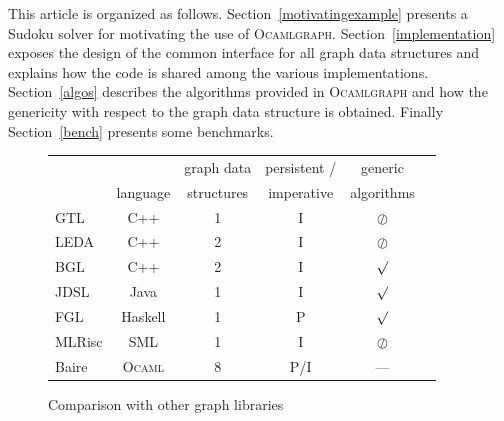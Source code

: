 \documentclass[tfpsymp]{tfp05symp}
\newcommand{\ocamlgraph}{\textsc{Ocamlgraph}\xspace}
\newcommand{\ocaml}{\textsc{Ocaml}\xspace}
\begin{document}
This article is organized as follows. Section~\ref{motivatingexample}
presents a Sudoku solver for motivating the use of \ocamlgraph.
Section~\ref{implementation} exposes the design of the common
interface for all graph data structures and explains how the code is
shared among the various implementations.  Section~\ref{algos}
describes the algorithms provided in \ocamlgraph and how the
genericity with respect to the graph data structure is obtained.
Finally Section~\ref{bench} presents some benchmarks.



\begin{figure}[t]
\newcommand{\present}{\large\boldmath $\surd$}
\newcommand{\absent}{\large\boldmath $\oslash$}

  \centering
  \begin{tabular}{|l||c|c|c|c|c|}
    \hline
     &          & graph data & persistent / & generic    \\
     & language & structures & imperative   & algorithms \\\hline\hline
     GTL \cite{Gtl} & C++     & 1  & I & \absent   \\\hline
     LEDA \cite{Leda} & C++    & 2  & I & \absent   \\\hline
     BGL \cite{Bgl} & C++     & 2  & I & \present  \\\hline
     JDSL \cite{Jdsl} & Java   & 1  & I & \present  \\\hline
     FGL \cite{Fgl} & Haskell & 1  & P & \present  \\\hline
     MLRisc \cite{Mlrisc} & SML  & 1  & I & \absent   \\\hline
     Baire \cite{Baire}\footnotemark & \ocaml & 8 &P/I& ---      \\\hline
  \end{tabular}
  \medskip
  \caption{Comparison with other graph libraries}
  \label{comparison:tab}
\end{figure}
\end{document}
